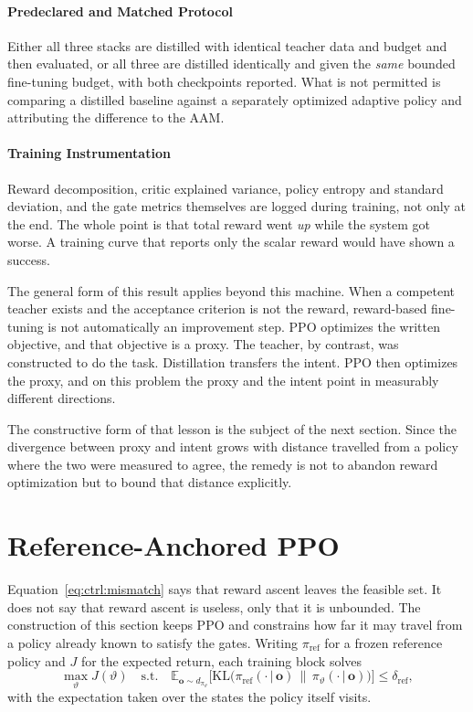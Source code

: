 \paragraph{Predeclared and Matched Protocol}
Either all three stacks are distilled with identical teacher data and budget
and then evaluated, or all three are distilled identically and given the
\emph{same} bounded fine-tuning budget, with both checkpoints reported. What is
not permitted is comparing a distilled baseline against a separately optimized
adaptive policy and attributing the difference to the AAM.

\paragraph{Training Instrumentation}
Reward decomposition, critic explained variance, policy entropy and standard
deviation, and the gate metrics themselves are logged during training, not only
at the end. The whole point is that total reward went \emph{up} while the
system got worse. A training curve that reports only the scalar reward would
have shown a success.

The general form of this result applies beyond this machine. When a
competent teacher exists and the acceptance criterion is
not the reward, reward-based fine-tuning is not automatically an improvement
step. PPO optimizes the written objective, and that objective is a proxy. The
teacher, by contrast, was constructed to do the task. Distillation transfers
the intent. PPO then optimizes the proxy, and on this problem the proxy and the
intent point in measurably different directions.

The constructive form of that lesson is the subject of the next section. Since
the divergence between proxy and intent grows with distance travelled from a
policy where the two were measured to agree, the remedy is not to abandon
reward optimization but to bound that distance explicitly.

\section{Reference-Anchored PPO}
\label{sec:ctrl:anchored}

Equation~\eqref{eq:ctrl:mismatch} says that reward ascent leaves the feasible
set. It does not say that reward ascent is useless, only that it is unbounded.
The construction of this section keeps PPO and constrains how far it may travel
from a policy already known to satisfy the gates. Writing $\pi_{\mathrm{ref}}$
for a frozen reference policy and $J$ for the expected return, each training
block solves
%
\begin{equation}
  \label{eq:ctrl:constrained}
  \max_{\vartheta} J(\vartheta)
  \quad \text{s.t.} \quad
  \mathbb{E}_{\bm{o}\sim d_{\pi_\vartheta}}
  \bigl[ \mathrm{KL}\bigl( \pi_{\mathrm{ref}}(\cdot\,|\,\bm{o})
  \,\|\, \pi_\vartheta(\cdot\,|\,\bm{o}) \bigr) \bigr]
  \le \delta_{\mathrm{ref}},
\end{equation}
%
with the expectation taken over the states the policy itself visits.

